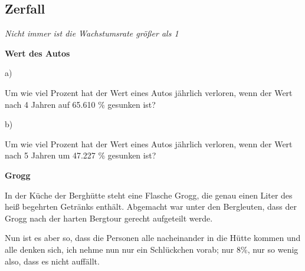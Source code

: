 \subsection{Zerfall}
\textit{Nicht immer ist die Wachstumsrate größer als 1}



\bbwActAufgabenNr{} \textbf{Wert des Autos}

a)

Um wie viel Prozent hat der Wert eines Autos jährlich verloren, wenn
der Wert nach 4 Jahren auf 65.610 \% gesunken ist?

b)

Um wie viel Prozent hat der Wert eines Autos jährlich verloren, wenn
der Wert nach 5 Jahren um 47.227 \% gesunken ist?


\nextBbwAufgabenNummer%
\platzFuerBerechnungenBisEndeSeite{}



\bbwActAufgabenNr{} \textbf{Grogg}

In der Küche der Berghütte steht eine Flasche Grogg, die genau einen Liter des
heiß begehrten Getränks enthält. Abgemacht war unter den Bergleuten,
dass der Grogg nach der harten Bergtour gerecht aufgeteilt werde.

Nun ist es aber so, dass die Personen alle nacheinander in die Hütte
kommen und alle denken sich, ich nehme nun nur ein Schlückchen vorab; 
nur 8\%, nur so wenig also, dass es nicht auffällt.

